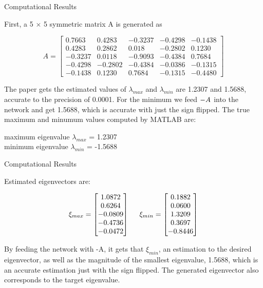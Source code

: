 \documentclass[13.5pt, aspectratio=169]{beamer}
\newcommand\tab[1][0.5cm]{\hspace*{#1}}
\begin{document}
\begin{frame}{Computational Results}

    First, a 5 $\times$ 5 symmetric matrix A is generated as

    \[
        A =
        \begin{bmatrix}
            0.7663  & 0.4283  & -0.3237 & -0.4298 & -0.1438 \\
            0.4283  & 0.2862  & 0.018   & -0.2802 & 0.1230  \\
            -0.3237 & 0.0118  & -0.9093 & -0.4384 & 0.7684  \\
            -0.4298 & -0.2802 & -0.4384 & -0.0386 & -0.1315 \\
            -0.1438 & 0.1230  & 0.7684  & -0.1315 & -0.4480
        \end{bmatrix}
    \]

    The paper gets the estimated values of $\lambda_{max}$ and $\lambda_{min}$ are 1.2307 and 1.5688, accurate to the precision of 0.0001. For the minimum we feed $\mathnormal{-A}$ into the network and get 1.5688, which is accurate with just the sign flipped. The true maximum and minumum values computed by MATLAB are:

    \begin{center}
        maximum eigenvalue \tab $\lambda_{max}$ = 1.2307    \\
        minimum eigenvalue \tab $\lambda_{min}$ = -1.5688
    \end{center}

\end{frame}

\begin{frame}{Computational Results}

    Estimated eigenvectors are:

    \[
        \xi_{max} =
        \begin{bmatrix}
            1.0872  \\
            0.6264  \\
            -0.0809 \\
            -0.4736 \\
            -0.0472
        \end{bmatrix}
        \text{\tab}
        \xi_{min} =
        \begin{bmatrix}
            0.1882 \\
            0.0600 \\
            1.3209 \\
            0.3697 \\
            -0.8446
        \end{bmatrix}
    \]

    By feeding the network with -A, it gets that $\xi_{min}$, an estimation to the desired eigenvector, as
    well as the magnitude of the smallest eigenvalue, 1.5688, which is an accurate estimation just
    with the sign flipped. The generated eigenvector also corresponds to the target eigenvalue.

\end{frame}
\end{document}
